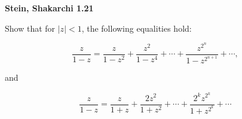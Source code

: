 \textbf{Stein, Shakarchi 1.21}

Show that for $|z| < 1$, the following equalities hold:

$$
\frac{z}{1 - z} = \frac{z}{1 - z^2} + \frac{z^2}{1 - z^4} + \cdots + \frac{z^{2^n}}{1 - z^{2^{n+1}}} + \cdots,
$$

and 

$$
\frac{z}{1 - z} = \frac{z}{1 + z} + \frac{2z^2}{1 + z^2} + \cdots + \frac{2^k z^{2^k}}{1 + z^{2^k}} + \cdots
$$

\begin{solution}
    \ \\
\end{solution}
